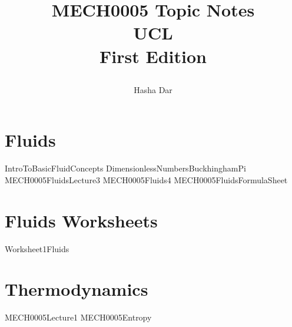 \documentclass[12pt,a4paper, twoside]{report}
\numberwithin{equation}{section}
\begin{document}
\title{
  {MECH0005 Topic Notes}\\
  {\large UCL}\\
  {\large First Edition}
  \author{Hasha Dar}
}
\maketitle

\tableofcontents
\chapter{Fluids}
{IntroToBasicFluidConcepts}
{DimensionlessNumbersBuckhinghamPi}
{MECH0005FluidsLecture3}
{MECH0005Fluids4}
{MECH0005FluidsFormulaSheet}

\chapter{Fluids Worksheets}
{Worksheet1Fluids}

\chapter{Thermodynamics}
{MECH0005Lecture1}
{MECH0005Entropy}
\end{document}
